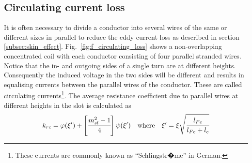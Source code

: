 \subsection{Circulating current loss}\label{sec:circulating_loss}
It is often necessary to divide a conductor into several wires of the same or different sizes in parallel to reduce the eddy current loss as described in section \ref{subsec:skin_effect}. Fig.~\ref{fig:f_circulating_loss} shows a non-overlapping concentrated coil with each conductor consisting of four parallel stranded wires. Notice that the in- and outgoing sides of a single turn are at different heights. Consequently the induced voltage in the two sides will be different and results in equalising currents between the parallel wires of the conductor. These are called circulating currents\footnote{These currents are commonly known as ``Schlingstr�me'' in German.}. The average resistance coefficient due to parallel wires at different heights in the slot is calculated as
\begin{equation}
  \label{eqn:kr5}
  k_{rc} = \varphi(\xi')+
  \left[
  \cfrac{m_{sl}^2-1}{4}
  \right]
  \psi(\xi') \quad \mbox{where} \quad \xi'=\xi\sqrt{\cfrac{l_{Fe}}{l_{Fe}+l_e}}
\end{equation}

